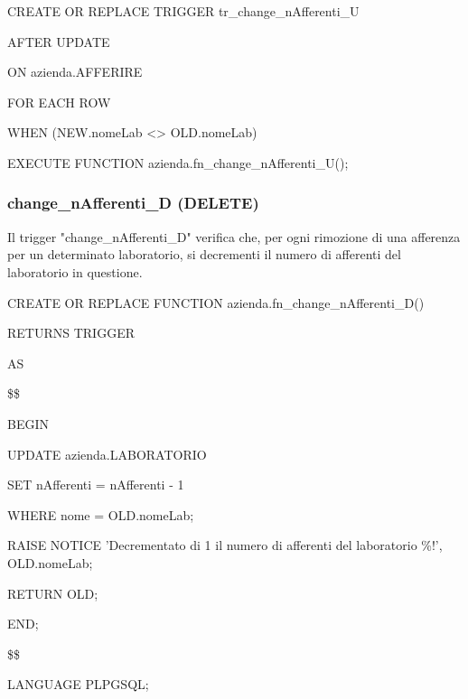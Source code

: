     \ttfamily
        \begin{flushleft}
            \begin{description}
                \item CREATE OR REPLACE TRIGGER tr\_change\_nAfferenti\_U
                \item AFTER UPDATE
                \item ON azienda.AFFERIRE
                \item FOR EACH ROW
                \item WHEN (NEW.nomeLab <> OLD.nomeLab)
                \item EXECUTE FUNCTION azienda.fn\_change\_nAfferenti\_U();
            \end{description}
        \end{flushleft}
    \normalfont

    \newpage

    \subsubsection{change\_nAfferenti\_D (DELETE)}
    Il trigger "change\_nAfferenti\_D" verifica che, per ogni rimozione di una afferenza per un determinato laboratorio, si decrementi il numero di afferenti
    del laboratorio in questione.

    \ttfamily
        \begin{flushleft}
            \begin{description}
                \item CREATE OR REPLACE FUNCTION azienda.fn\_change\_nAfferenti\_D()
                \item RETURNS TRIGGER
                \item AS 
                \item \$\$
                \item BEGIN
                \begin{description}
                    \item UPDATE azienda.LABORATORIO
                    \item SET nAfferenti = nAfferenti - 1
                    \item WHERE nome = OLD.nomeLab;
                    \item 
                    \item RAISE NOTICE 'Decrementato di 1 il numero di afferenti del laboratorio \%!', OLD.nomeLab;
                    \item 
                    \item RETURN OLD;
                \end{description}
                \item END;
                \item \$\$
                \item LANGUAGE PLPGSQL;
            \end{description}
        \end{flushleft}
    \normalfont

